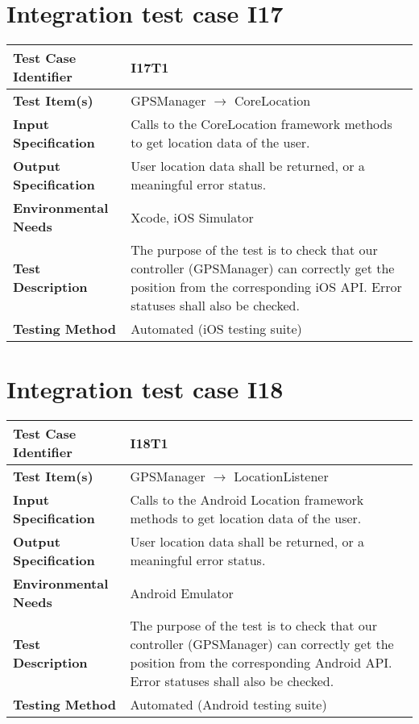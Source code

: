 \vspace{2em}

\section{Integration test case I17}

\begin{tabular}{l p{}}
    \hline
    \textbf{Test Case Identifier} & I17T1\\
    \hline
    \textbf{Test Item(s)} & GPSManager $\rightarrow$ CoreLocation \\
    \hline
    \textbf{Input Specification} & Calls to the CoreLocation framework methods to get location data of the user. \\
    \hline
    \textbf{Output Specification} & User location data shall be returned, or a meaningful error status. \\
    \hline
    \textbf{Environmental Needs} & Xcode, iOS Simulator \\
    \hline
    \textbf{Test Description} & The purpose of the test is to check that our controller (GPSManager) can correctly get the position from the corresponding iOS API. Error statuses shall also be checked. \\
    \hline
    \textbf{Testing Method} & Automated (iOS testing suite) \\
    \hline
\end{tabular}

\vspace{2em}

\section{Integration test case I18}

\begin{tabular}{l p{}}
    \hline
    \textbf{Test Case Identifier} & I18T1\\
    \hline
    \textbf{Test Item(s)} & GPSManager $\rightarrow$ LocationListener \\
    \hline
    \textbf{Input Specification} & Calls to the Android Location framework methods to get location data of the user. \\
    \hline
    \textbf{Output Specification} & User location data shall be returned, or a meaningful error status. \\
    \hline
    \textbf{Environmental Needs} & Android Emulator \\
    \hline
    \textbf{Test Description} & The purpose of the test is to check that our controller (GPSManager) can correctly get the position from the corresponding Android API. Error statuses shall also be checked. \\
    \hline
    \textbf{Testing Method} & Automated (Android testing suite) \\
    \hline
\end{tabular}


